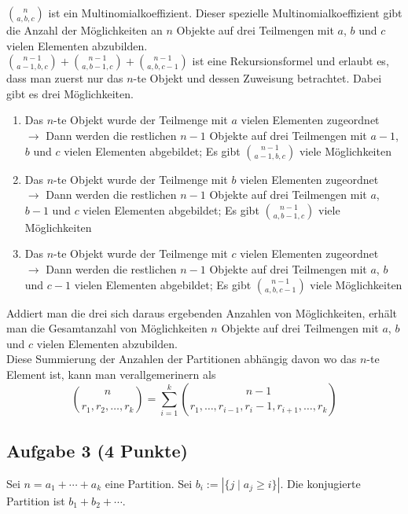 \documentclass{article} %
\begin{document}
\begin{mybox}
$\binom{n}{a, b, c}$ ist ein Multinomialkoeffizient. Dieser spezielle Multinomialkoeffizient gibt die Anzahl der Möglichkeiten an $n$ Objekte auf drei Teilmengen mit $a$, $b$ und $c$ vielen Elementen abzubilden. \\
$\binom{n-1}{a-1, b, c} + 
\binom{n-1}{a, b-1, c} + 
\binom{n-1}{a, b, c-1}$ ist eine Rekursionsformel und erlaubt es, dass man zuerst nur das $n$-te Objekt und dessen Zuweisung betrachtet. Dabei gibt es drei Möglichkeiten. 
\begin{enumerate}
    \item Das $n$-te Objekt wurde der Teilmenge mit $a$ vielen Elementen zugeordnet \\
    $\rightarrow$ Dann werden die restlichen $n-1$ Objekte auf drei Teilmengen mit $a-1$, $b$ und $c$ vielen Elementen abgebildet; Es gibt $\binom{n-1}{a-1, b, c}$ viele Möglichkeiten
    \item Das $n$-te Objekt wurde der Teilmenge mit $b$ vielen Elementen zugeordnet\\
    $\rightarrow$ Dann werden die restlichen $n-1$ Objekte auf drei Teilmengen mit $a$, $b-1$ und $c$ vielen Elementen abgebildet; Es gibt $\binom{n-1}{a, b-1, c}$ viele Möglichkeiten
    \item Das $n$-te Objekt wurde der Teilmenge mit $c$ vielen Elementen zugeordnet\\
    $\rightarrow$ Dann werden die restlichen $n-1$ Objekte auf drei Teilmengen mit $a$, $b$ und $c-1$ vielen Elementen abgebildet; Es gibt $\binom{n-1}{a, b, c-1}$ viele Möglichkeiten
\end{enumerate}
Addiert man die drei sich daraus ergebenden Anzahlen von Möglichkeiten, erhält man die Gesamtanzahl von Möglichkeiten $n$ Objekte auf drei Teilmengen mit $a$, $b$ und $c$ vielen Elementen abzubilden.\\ \newline
Diese Summierung der Anzahlen der Partitionen abhängig davon wo das $n$-te Element ist, kann man verallgemerinern als 
\[
\binom{n}{r_1, r_2, \dots, r_k} = \sum_{i=1}^{k} \binom{n-1}{r_1, \dots, r_{i-1}, r_i-1, r_{i+1}, \dots, r_k} 
\]
\end{mybox}

\subsection*{Aufgabe 3 (4 Punkte)}

Sei \(n = a_1 + \cdots + a_k\) eine Partition. Sei \(b_i := |\{j \mid a_j \geq i\}|\). Die konjugierte Partition ist 
\(b_1 + b_2 + \cdots\).
\end{document}

